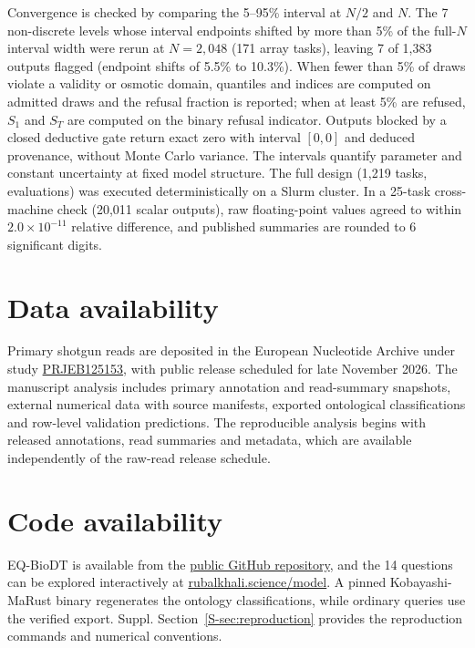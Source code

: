 \documentclass[11pt,a4paper]{article}
\begin{document}
Convergence is checked by comparing the 5--95\% interval at $N/2$ and $N$. The 7 non-discrete levels whose interval endpoints shifted by more than 5\% of the full-$N$ interval width were rerun at $N=2,048$ (171 array tasks), leaving 7 of 1,383 outputs flagged (endpoint shifts of 5.5\% to 10.3\%). When fewer than 5\% of draws violate a validity or osmotic domain, quantiles and indices are computed on admitted draws and the refusal fraction is reported; when at least 5\% are refused, $S_1$ and $S_T$ are computed on the binary refusal indicator. Outputs blocked by a closed deductive gate return exact zero with interval $[0,0]$ and deduced provenance, without Monte Carlo variance. The intervals quantify parameter and constant uncertainty at fixed model structure. The full design (1,219 tasks, \UQEvaluations{} evaluations) was executed deterministically on a Slurm cluster. In a 25-task cross-machine check (20,011 scalar outputs), raw floating-point values agreed to within $2.0\times 10^{-11}$ relative difference, and published summaries are rounded to 6 significant digits.

\section*{Data availability}
Primary shotgun reads are deposited in the European Nucleotide Archive under study \href{https://www.ebi.ac.uk/ena/browser/view/PRJEB125153}{PRJEB125153}, with public release scheduled for late November 2026. The manuscript analysis includes primary annotation and read-summary snapshots, external numerical data with source manifests, exported ontological classifications and row-level validation predictions. The reproducible analysis begins with released annotations, read summaries and metadata, which are available independently of the raw-read release schedule.

\section*{Code availability}
EQ-BioDT is available from the \href{https://github.com/bio-ontology-research-group/empty-quarter-digital-twin}{public GitHub repository}, and the 14 questions can be explored interactively at \href{https://rubalkhali.science/model}{rubalkhali.science/model}. A pinned Kobayashi-MaRust binary regenerates the ontology classifications, while ordinary queries use the verified export. Suppl. Section~\ref{S-sec:reproduction} provides the reproduction commands and numerical conventions.



\end{document}
